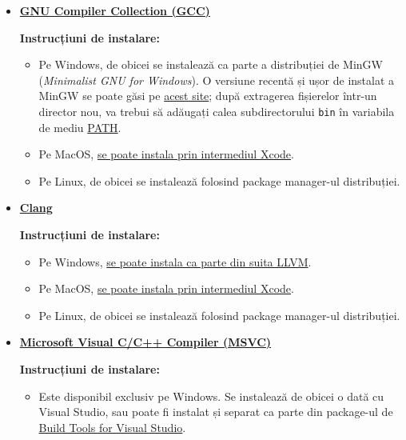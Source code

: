 \begin{itemize}
    \item \href{https://gcc.gnu.org/}{\textbf{GNU Compiler Collection (GCC)}}

    \textbf{Instrucțiuni de instalare:}
    \begin{itemize}
        \item Pe Windows, de obicei se instalează ca parte a distribuției de MinGW (\textit{Minimalist GNU for Windows}). O versiune recentă și ușor de instalat a MinGW se poate găsi pe \href{https://nuwen.net/mingw.html}{acest site}; după extragerea fișierelor într-un director nou, va trebui să adăugați calea subdirectorului \texttt{bin} în variabila de mediu \href{https://www.java.com/en/download/help/path.html}{PATH}.

        \item Pe MacOS, \href{https://www.cyberciti.biz/faq/howto-apple-mac-os-x-install-gcc-compiler/}{se poate instala prin intermediul Xcode}.

        \item Pe Linux, de obicei se instalează folosind package manager-ul distribuției.
    \end{itemize}
    
    \item \href{https://clang.llvm.org/}{\textbf{Clang}}

    \textbf{Instrucțiuni de instalare:}
    \begin{itemize}
        \item Pe Windows, \href{https://releases.llvm.org/download.html}{se poate instala ca parte din suita LLVM}.

        \item Pe MacOS, \href{https://stackoverflow.com/a/12228613/5723188}{se poate instala prin intermediul Xcode}.

        \item Pe Linux, de obicei se instalează folosind package manager-ul distribuției.
    \end{itemize}
    
    \item \href{https://visualstudio.microsoft.com/vs/features/cplusplus/}{\textbf{Microsoft Visual C/C++ Compiler (MSVC)}}

    \textbf{Instrucțiuni de instalare:}
    \begin{itemize}
        \item Este disponibil exclusiv pe Windows. Se instalează de obicei o dată cu Visual Studio, sau poate fi instalat și separat ca parte din package-ul de \href{https://visualstudio.microsoft.com/downloads/#build-tools-for-visual-studio-2022}{Build Tools for Visual Studio}.
    \end{itemize}
\end{itemize}

